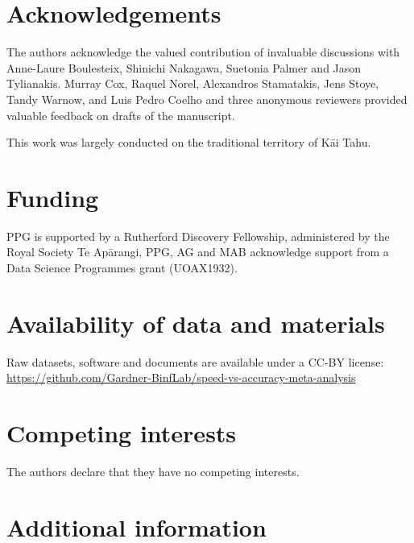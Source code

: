 \documentclass{bmcart}
\begin{document}
\begin{backmatter}

\section*{Acknowledgements}
The authors acknowledge the valued contribution of invaluable
discussions with Anne-Laure Boulesteix, Shinichi Nakagawa, Suetonia
Palmer and Jason Tylianakis. Murray Cox, Raquel
Norel, Alexandros Stamatakis, Jens Stoye, Tandy Warnow, and 
{\color{red}Luis Pedro Coelho and three anonymous reviewers} provided
valuable feedback on drafts of the manuscript.

This work was largely conducted on the traditional territory of K\=ai Tahu.

\section*{Funding}
PPG is supported by a Rutherford Discovery Fellowship,
administered by the Royal Society Te Ap\=arangi, 
PPG, AG and MAB acknowledge support from a Data Science Programmes grant
(UOAX1932).

\section*{Availability of data and materials}
Raw datasets, software and documents are available under a CC-BY license:\\
\fussy
\url{https://github.com/Gardner-BinfLab/speed-vs-accuracy-meta-analysis}
\sloppy

\section*{Competing interests}
The authors declare that they have no competing interests.

\section*{Additional information}


\end{backmatter}
\end{document}
